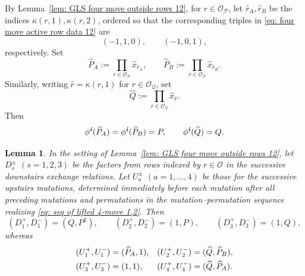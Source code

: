 \documentclass[12pt, leqno]{amsart}
\numberwithin{equation}{section}
\theoremstyle{plain}
\newtheorem{lemma}{Lemma}[section]
\theoremstyle{definition}
\newcommand{\seteq}{\mathbin{:=}}
\newcommand{\ii}{ \textbf{\textit{i}}}
\newcommand{\hP}{\widehat{P}}
\newcommand{\hQ}{\widehat{Q}}
\newcommand{\hr}{\widehat{r}}
\newcommand{\hx}{\widehat{x}}
\newcommand{\calO}{\mathcal{O}}
\newcommand{\calP}{\mathcal{P}}
\newcommand{\calQ}{\mathcal{Q}}
\begin{document}
By Lemma~\ref{lem: GLS four move outside rows 12},  for $r\in\calO_{\calP}$, let $\hr_A,\hr_B$ be the indices
$\kappa(r,1),\kappa(r,2)$, ordered so that the corresponding triples in
  \eqref{eq: four move active row data 12}  are
\[
  (-1,1,0),  \qquad   (-1,0,1),
\]
respectively. Set
\[
\hP_A \seteq \prod_{r\in\calO_{\calP}}\hx_{\hr_A},
\qquad
\hP_B \seteq \prod_{r\in\calO_{\calP}}\hx_{\hr_B}.
\]
 Similarly, writing $\hr=\kappa(r,1)$ for $r\in\calO_{\calQ}$, set
\[
\hQ \seteq \prod_{r\in\calO_{\calQ}}\hx_{\hr}.
\]
Then
\[
\phi^\ii(\hP_A) = \phi^\ii(\hP_B) = P, \qquad \phi^\ii(\hQ)=Q.
\]

\begin{lemma}\label{lem: tropical four move 12}
In the setting of Lemma~\ref{lem: GLS four move outside rows 12}, let
$D_s^\pm$ $(s=1,2,3)$ be the factors from  rows indexed by $r\in\calO$ in the
successive downstairs exchange relations. Let $U_a^\pm$ $(a=1,\ldots,4)$
be those for the successive upstairs mutations, determined immediately
before each mutation after all preceding mutations and permutations
 in the mutation--permutation sequence realizing \eqref{eq: seq of lifted 4-move 1,2}. Then
\[
(D_1^+,D_1^-)=(Q,P^2),\qquad
(D_2^+,D_2^-)=(1,P),\qquad
(D_3^+,D_3^-)=(1,Q),
\]
whereas
\begin{align*}
(U_1^+,U_1^-)&=(\hP_A,1),&
(U_2^+,U_2^-)&=(\hQ,\hP_B),\allowdisplaybreaks\\
(U_3^+,U_3^-)&=(1,1),&
(U_4^+,U_4^-)&=(\hQ,\hP_A).
\end{align*}
\end{lemma}
\end{document}
